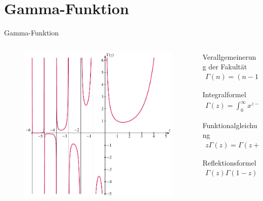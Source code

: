 \section{Gamma-Funktion}

\begin{frame}{Gamma-Funktion}
\begin{columns}

\begin{column}{0.55\textwidth}
\begin{figure}[h]
\vspace{-16pt}
\centering
\includegraphics[width=1\textwidth]{../images/gammaplot.pdf}
\end{figure}
\end{column}

\begin{column}{0.45\textwidth}
Verallgemeinerung der Fakultät
\begin{align*}
\Gamma(n) = (n-1)!    
\end{align*}

Integralformel
\begin{align*}
\Gamma(z) 
=
\int_0^\infty x^{z-1} e^{-x} \, dx
,\quad
\operatorname{Re} z > 0
\end{align*}

Funktionalgleichung
\begin{align*}
z \Gamma(z)
=
\Gamma(z + 1)
\end{align*}

Reflektionsformel
\begin{align*}
\Gamma(z) \Gamma(1 - z)
=
\frac{\pi}{\sin \pi z}
, \quad
\text{für }
z \notin \mathbb{Z}
\end{align*}

\end{column}
\end{columns}

\end{frame}
